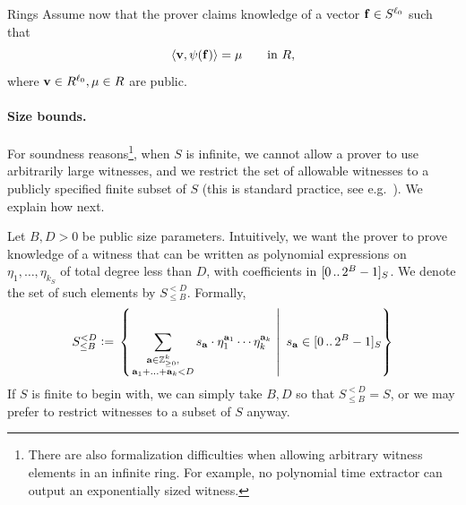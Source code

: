 \begin{lncsmove}{Rings}
Assume now that the prover claims knowledge of a vector $\mathbf{f}\in S^{\ell_0}$ such that
 \begin{equation}\label{e:new_to_0_rings}\langle \mathbf{v}, \psi(\mathbf{f})\rangle =\mu \qquad \text{in  } R,
\end{equation}
where $\mathbf{v}\in R^{\ell_0}, \mu\in R$ are public.  



\paragraph{Size bounds.} For soundness reasons\footnote{There are also formalization difficulties when allowing arbitrary witness elements in an infinite ring. For example, no polynomial time extractor can output an exponentially sized witness.}, when $S$ is infinite, we cannot allow a prover to use arbitrarily large witnesses, and we  restrict the set of allowable witnesses to a publicly specified finite subset of $S$ (this is standard practice, see e.g.\ \cite{zaratan,zinc,qaren,limber,zincplus}). We explain how next. 

Let $B,D>0$ be public size parameters.  Intuitively, we want the prover to prove knowledge of a witness that can be written as polynomial expressions on $\eta_1, \ldots, \eta_{k_S}$ of total degree less than $D$, with coefficients in $[0 \, .. \, 2^B-1]_S$. We denote the set of such elements by $S_{\leq B}^{<D}$. Formally,
 $$
S_{\leq B}^{<D}{\;\vcentcolon=\;} \left\{\left.\sum_{\substack{\mathbf{a}\in \mathbb{Z}_{\geq 0}^k,\\  \mathbf{a}_1+\ldots+\mathbf{a}_k<D} } s_{\mathbf{a}}\cdot \eta_1^{\mathbf{a}_1}\cdots\eta_k^{\mathbf{a}_k} \ \right| \ s_{\mathbf{a}}\in [0 \, .. \, 2^B-1]_S\right\}
 $$
  If $S$ is finite to begin with, we can simply take $B,D$ so that $S_{\leq B}^{<D}=S$, or we may prefer to  restrict witnesses to a subset of $S$ anyway.



\end{lncsmove}
